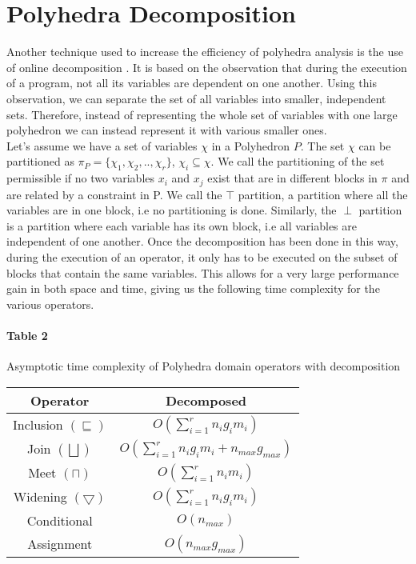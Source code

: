 \section{Polyhedra Decomposition}
Another technique used to increase the efficiency of polyhedra analysis is the use of online decomposition \cite{singh2017fast}. It is based on the observation that during the execution of a program, not all its variables are dependent on one another. Using this observation, we can separate the set of all variables into smaller, independent sets. Therefore, instead of representing the whole set of variables with one large polyhedron we can instead represent it with various smaller ones.\\ Let's assume we have a set of variables $\chi$ in a Polyhedron $P$. The set $\chi$ can be partitioned as $\pi_P=\{ \chi_1,\chi_2,..,\chi_r\}$, $\chi_i\subseteq\chi $. We call the partitioning of the set permissible if no two variables $x_i$ and $x_j$ exist that are in different blocks in $\pi$ and are related by a constraint in P. We call the $\top$ partition, a partition where all the variables are in one block, i.e no partitioning is done. Similarly, the $\perp$ partition is a partition where each variable has its own block, i.e all variables are independent of one another. Once the decomposition has been done in this way, during the execution of an operator, it only has to be executed on the subset of blocks that contain the same variables. This allows for a very large performance gain in both space and time, giving us the following time complexity for the various operators.

\paragraph{Table 2} Asymptotic time complexity of Polyhedra domain operators with decomposition

\begin{center}
\begin{tabular}{||c c||} 
 
 \hline
 Operator & Decomposed  \\ [0.5ex] 
 \hline
 Inclusion $(\sqsubseteq)$ & $O(\sum_{i=1}^r n_ig_im_i)$\\ 
 \hline
 Join $(\bigsqcup)$ & $O(\sum_{i=1}^r n_i g_i m_i + n_{max} g_{max})$ \\
 \hline
 Meet $(\sqcap)$ & $O(\sum_{i=1}^r n_i m_i)$ \\
 \hline
 Widening $(\bigtriangledown)$ & $O(\sum_{i=1}^r n_i g_i m_i)$\\
 \hline
 Conditional & $O(n_{max})$ \\ 
 \hline
 Assignment & $O(n_{max}g_{max})$ \\ 
 
 
 \hline
\end{tabular}
\end{center}

